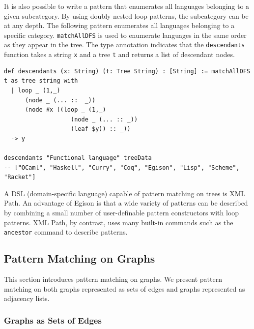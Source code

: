 It is also possible to write a pattern that enumerates all languages belonging to a given subcategory.
By using doubly nested loop patterns, the subcategory can be at any depth.
The following pattern enumerates all languages belonging to a specific category.
\lstinline{matchAllDFS} is used to enumerate languages in the same order as they appear in the tree.
The type annotation indicates that the \lstinline{descendants} function takes a string \lstinline{x} and a tree \lstinline{t} and returns a list of descendant nodes.
\begin{lstlisting}[language=egison,numbers=none]
def descendants (x: String) (t: Tree String) : [String] := matchAllDFS t as tree string with
  | loop _ (1,_)
      (node _ (... ::  _))
      (node #x ((loop _ (1,_)
                   (node _ (... :: _))
                   (leaf $y)) :: _))
  -> y

descendants "Functional language" treeData
-- ["OCaml", "Haskell", "Curry", "Coq", "Egison", "Lisp", "Scheme", "Racket"]
\end{lstlisting}

A DSL (domain-specific language) capable of pattern matching on trees is XML Path.
An advantage of Egison is that a wide variety of patterns can be described by combining a small number of user-definable pattern constructors with loop patterns.
XML Path, by contrast, uses many built-in commands such as the \lstinline{ancestor} command to describe patterns.

\subsection{Pattern Matching on Graphs}\label{pmo-graph}

This section introduces pattern matching on graphs.
We present pattern matching on both graphs represented as sets of edges and graphs represented as adjacency lists.

\subsubsection{Graphs as Sets of Edges}\label{pmo-graph-set}


